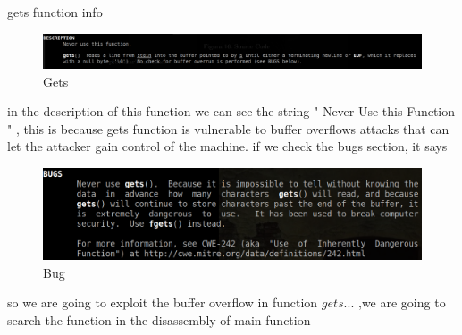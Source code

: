 \documentclass[10pt,a4paper]{article} %
\begin{document}
                \newpage
                gets function info
                \begin{figure}[h!]
                    \centering
                    \includegraphics[width=0.5\linewidth]{gets.png}
                    \caption{Gets}
                    \label{fig:gets}
                \end{figure}

                in the description of this function we can see the string " Never
                Use this Function  " , this is because gets function is vulnerable
                to buffer overflows attacks that can let the attacker gain control
                of the machine.
                if we check the bugs section, it says
                \begin{figure}[h!]
                    \centering
                    \includegraphics[width=0.4\linewidth]{bug.png}
                    \caption{Bug}
                    \label{fig:bug}
                \end{figure}
                so we are going to exploit the buffer overflow in function $
                gets...  $ ,we are going to search the function in the disassembly
                of main function
\end{document}
